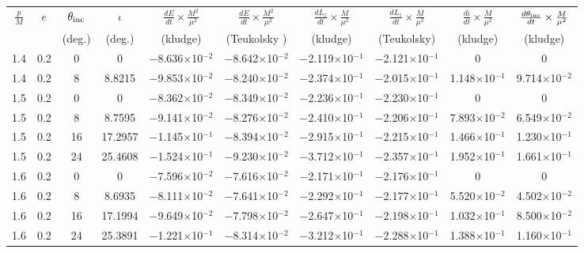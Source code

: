 \documentclass[aps,prd,twocolumn,showpacs,groupedaddress,nofootinbib]{revtex4}
\newcommand\T{\rule{0pt}{3ex}}
\newcommand\B{\rule[-2ex]{0pt}{0pt}}
\begin{document}
\begin{widetext}
\begin{table}[h]
\begin{tabular}{|c|c|c|c|c|c|c|c|c|c|}
\hline
 \T\B$\frac{p}{M}$ & $e$ & $\theta_{\rm inc}$& $\iota$& $\frac{dE}{dt}\times\frac{M^2}{\mu^2}$ & $\frac{dE}{dt}\times\frac{M^2}{\mu^2}$ & $\frac{dL_z}{dt}\times\frac{M}{\mu^2}$ & $\frac{dL_z}{dt}\times\frac{M}{\mu^2}$ & $\frac{d\iota}{dt}\times\frac{M}{\mu^2}$&  $\frac{d\theta_{\rm inc}}{dt}\times\frac{M}{\mu^2}$\\
&&(deg.)&(deg.)& (kludge) & (Teukolsky ) & (kludge) & (Teukolsky)& (kludge) & (kludge) \\
\hline
\T 1.4&  0.2&  0&  0& $-$8.636$\times$10$^{-2}$& $-$8.642$\times$10$^{-2}$& $-$2.119$\times$10$^{-1}$& $-$2.121$\times$10$^{-1}$&  0&    0\\
  1.4&  0.2&  8&  8.8215& $-$9.853$\times$10$^{-2}$& $-$8.240$\times$10$^{-2}$& $-$2.374$\times$10$^{-1}$& $-$2.015$\times$10$^{-1}$&  1.148$\times$10$^{-1}$&   9.714$\times$10$^{-2}$\\
  1.5&  0.2&  0&  0& $-$8.362$\times$10$^{-2}$& $-$8.349$\times$10$^{-2}$& $-$2.236$\times$10$^{-1}$& $-$2.230$\times$10$^{-1}$&  0&    0\\
  1.5&  0.2&  8&  8.7595& $-$9.141$\times$10$^{-2}$& $-$8.276$\times$10$^{-2}$& $-$2.410$\times$10$^{-1}$& $-$2.206$\times$10$^{-1}$&  7.893$\times$10$^{-2}$&    6.549$\times$10$^{-2}$\\
  1.5&  0.2& 16& 17.2957& $-$1.145$\times$10$^{-1}$& $-$8.394$\times$10$^{-2}$& $-$2.915$\times$10$^{-1}$& $-$2.215$\times$10$^{-1}$&  1.466$\times$10$^{-1}$&    1.230$\times$10$^{-1}$\\
  1.5&  0.2& 24& 25.4608& $-$1.524$\times$10$^{-1}$& $-$9.230$\times$10$^{-2}$& $-$3.712$\times$10$^{-1}$& $-$2.357$\times$10$^{-1}$&  1.952$\times$10$^{-1}$&    1.661$\times$10$^{-1}$\\
  1.6&  0.2&  0&  0& $-$7.596$\times$10$^{-2}$& $-$7.616$\times$10$^{-2}$& $-$2.171$\times$10$^{-1}$& $-$2.176$\times$10$^{-1}$&  0&    0\\
  1.6&  0.2&  8&  8.6935& $-$8.111$\times$10$^{-2}$& $-$7.641$\times$10$^{-2}$& $-$2.292$\times$10$^{-1}$& $-$2.177$\times$10$^{-1}$&  5.520$\times$10$^{-2}$&    4.502$\times$10$^{-2}$\\
  1.6&  0.2& 16& 17.1994& $-$9.649$\times$10$^{-2}$& $-$7.798$\times$10$^{-2}$& $-$2.647$\times$10$^{-1}$& $-$2.198$\times$10$^{-1}$&  1.032$\times$10$^{-1}$&    8.500$\times$10$^{-2}$\\
  1.6&  0.2& 24& 25.3891& $-$1.221$\times$10$^{-1}$& $-$8.314$\times$10$^{-2}$& $-$3.212$\times$10$^{-1}$& $-$2.288$\times$10$^{-1}$&  1.388$\times$10$^{-1}$&    1.160$\times$10$^{-1}$\\

\end{tabular}
\end{table}
\end{widetext}
\end{document}
